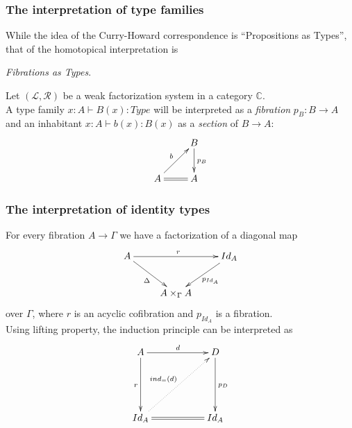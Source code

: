 \documentclass[dvipdfmx]{beamer}
\begin{document}
\begin{frame}
  \frametitle{The interpretation of type families}
  While the idea of the Curry-Howard correspondence is
  ``Propositions as Types'',
  that of the homotopical interpretation is
  \pause
  \begin{center}
    {\it Fibrations as Types}.
  \end{center}
  \pause
  Let $\left( {\mathcal L} , {\mathcal R} \right)$
  be a weak factorization system in a category ${\mathbb C}$.
  \\
  A type family $x : A \vdash B \left( x \right) : Type$
  will be interpreted as a {\it fibration} $p_{B} : B \to A$
  and an inhabitant
  $x : A \vdash b \left( x \right) : B \left( x \right)$
  as a {\it section} of
  $B \to A$:
  \[
    \xymatrix{
      & B \ar[d]^{p_{B}}
      \\
      A \ar@{=}[r] \ar[ur]^{b}
      & A
    }
  \]
\end{frame}

\begin{frame}
  \frametitle{The interpretation of identity types}
  For every fibration $A \to \Gamma$
  we have a factorization of a diagonal map
  \[
    \xymatrix{
      A \ar[rr]^{r} \ar[dr]_{\Delta}
      &
      & Id_{A} \ar[dl]^{p_{Id_A}}
      \\
      & A \times _{\Gamma}  A
      &
    }
  \]
  over $\Gamma$, where $r$ is an acyclic cofibration
  and $p_{Id_A}$ is a fibration.
  \pause
  \\
  Using lifting property,
  the induction principle can be interpreted as
  \[
    \xymatrix{
      A \ar[rr]^{d} \ar[dd]_{r}
      &
      & D \ar[dd]^{p_{D}}
      \\
      & & \\
      Id_{A} \ar@{=}[rr] \ar@{.>}[urur]^{ind_{=} \left( d \right)}
      &
      & Id_{A}
    }
  \]
\end{frame}
\end{document}
